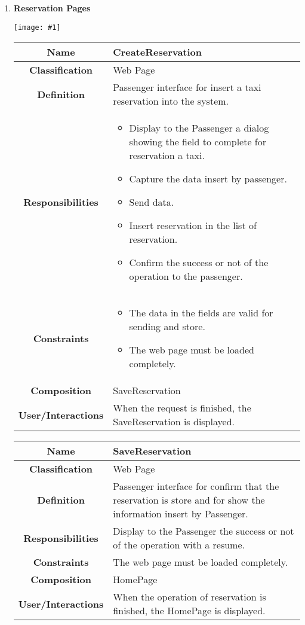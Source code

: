 \documentclass[11pt, a4paper,titlepage]{article}
\newcommand{\image}[1]{
	\begin{center}
		\noindent \texttt{[image: \#1]}
	\end{center}
	}
\begin{document}
\begin{enumerate}
\newpage
\item \textbf{Reservation Pages}\\
\image{page_reservation.png}
\begin{tabularx}{\textwidth}{| c | X |}
	\hline
	\textbf{Name} & 
	CreateReservation
	\\
	\hline
	\textbf{Classification} & 
	Web Page
	\\
	\hline
	\textbf{Definition} & 
	Passenger interface for insert a taxi reservation into the system.\\
	\hline
	\textbf{Responsibilities} &
	\begin{itemize}
		\item Display to the Passenger a dialog showing the field to     complete for reservation a taxi.
		\item  Capture the data insert by passenger.
		\item Send data.
		\item Insert reservation in the list of reservation.
		\item Confirm the success or not of the operation to the passenger.
	\end{itemize}
	\\
	\hline
	\textbf{Constraints} & 
	\begin{itemize}
		\item  The data in the fields are valid for sending and store.
		\item The web page must be loaded completely.
	\end{itemize}
	\\
	\hline
	\textbf{Composition} & 
	SaveReservation
	\\
	\hline
	\textbf{User/Interactions} & 
	When the request is finished, the SaveReservation is displayed.
	\\
	\hline	
\end{tabularx}

\begin{tabularx}{\textwidth}{| c | X |}
	\hline
	\textbf{Name} & 
	SaveReservation
	\\
	\hline
	\textbf{Classification} & 
	Web Page
	\\
	\hline
	\textbf{Definition} & 
	Passenger interface for confirm that the reservation is store and for show the information insert by Passenger.
	\\
	\hline
	\textbf{Responsibilities} &
	Display to the Passenger the success or not of the operation with a resume.
	\\
	\hline
	\textbf{Constraints} & 
	The web page must be loaded completely.
	\\
	\hline
	\textbf{Composition} & 
	HomePage
	\\
	\hline
	\textbf{User/Interactions} & 
	When the operation of reservation is finished, the HomePage is displayed.
	\\
	\hline	
\end{tabularx}


\end{enumerate}
\end{document}

